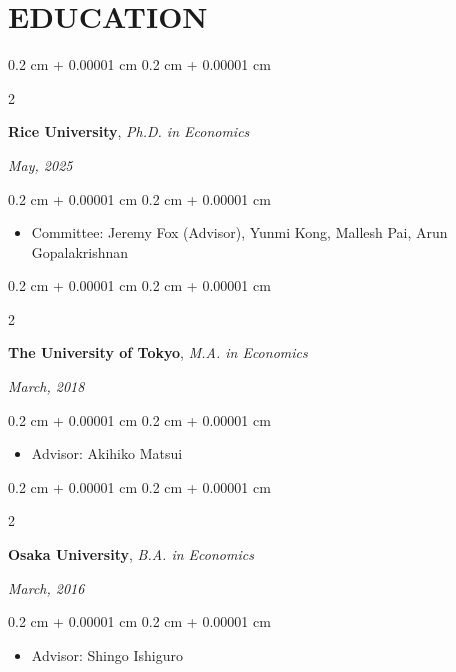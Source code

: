 \documentclass[10pt, letterpaper]{article}
\newenvironment{highlights}{
    \begin{itemize}[
        topsep=0.10 cm,
        parsep=0.10 cm,
        partopsep=0pt,
        itemsep=0.0 cm,
        leftmargin=0.4 cm + 10pt
    ]
}{
    \end{itemize}
} %
\newenvironment{onecolentry}{
    \begin{adjustwidth}{
        0.2 cm + 0.00001 cm
    }{
        0.2 cm + 0.00001 cm
    }
}{
    \end{adjustwidth}
} %
\newenvironment{twocolentry}[2][]{
    \onecolentry
    \def\secondColumn{#2}
    \setcolumnwidth{\fill, 4.5 cm}
    \begin{paracol}{2}
}{
    \switchcolumn \raggedleft \secondColumn
    \end{paracol}
    \endonecolentry
} %
\begin{document}
    \section{EDUCATION}
    \begin{twocolentry}{
        \textit{May, 2025}}
        \textbf{Rice University},
        \textit{Ph.D. in Economics}
    \end{twocolentry}
    \vspace{0.10 cm}
    \begin{onecolentry}
        \begin{highlights}
            \item Committee: Jeremy Fox (Advisor), Yunmi Kong, Mallesh Pai, Arun Gopalakrishnan
        \end{highlights}
    \end{onecolentry}
    \vspace{0.10 cm}
    \begin{twocolentry}{
        \textit{March, 2018}}
        \textbf{The University of Tokyo},       
        \textit{M.A. in Economics}
    \end{twocolentry}
    \vspace{0.10 cm}
    \begin{onecolentry}
        \begin{highlights}
            \item Advisor: Akihiko Matsui
        \end{highlights}
    \end{onecolentry}
    \vspace{0.10 cm}
    \begin{twocolentry}{
        \textit{March, 2016}}
        \textbf{Osaka University},
        \textit{B.A. in Economics}
    \end{twocolentry}
    \vspace{0.10 cm}
    \begin{onecolentry}
        \begin{highlights}
            \item Advisor: Shingo Ishiguro
        \end{highlights}
    \end{onecolentry}
\end{document}
